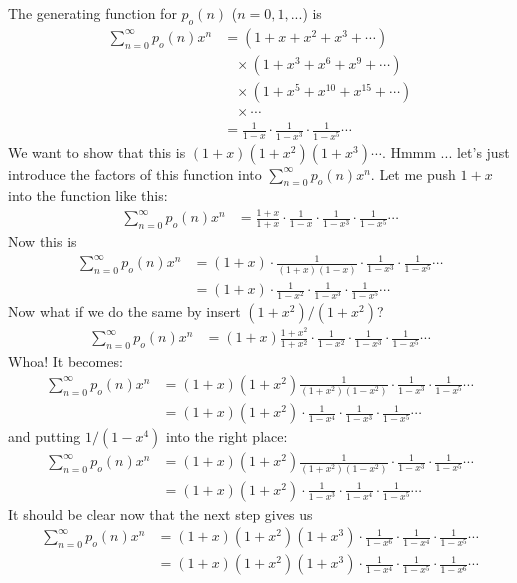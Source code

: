 The generating function for $p_o(n)$ ($n=0,1,...$) is
\begin{align*}
\sum_{n=0}^\infty p_o(n) x^n 
&= (1 + x + x^2 + x^3 + \cdots ) \\
& \,\,\,\,\, \times (1 + x^3 + x^6 + x^9 + \cdots ) \\
& \,\,\,\,\, \times (1 + x^5 + x^{10} + x^{15} + \cdots ) \\
& \,\,\,\,\, \times \cdots \\
&= \frac{1}{1 - x} \cdot \frac{1}{1 - x^3} \cdot\frac{1}{1 - x^5} \cdots 
\end{align*}
We want to show that this is $(1 + x) (1 + x^2) (1 + x^3) \cdots$.
Hmmm ... let's just introduce the factors of this function into $\sum_{n=0}^\infty p_o(n)x^n$.
Let me push $1+x$ into the function like this:
\begin{align*}
\sum_{n=0}^\infty p_o(n) x^n 
&= \frac{1+x}{1+x} \cdot \frac{1}{1 - x} \cdot \frac{1}{1 - x^3} \cdot\frac{1}{1 - x^5} \cdots 
\end{align*}
Now this is
\begin{align*}
\sum_{n=0}^\infty p_o(n) x^n 
&= (1+x) \cdot \frac{1}{(1+x)(1-x)} \cdot \frac{1}{1 - x^3} \cdot\frac{1}{1 - x^5} \cdots \\ 
&= (1+x) \cdot \frac{1}{1 - x^2} \cdot \frac{1}{1 - x^3} \cdot\frac{1}{1 - x^5} \cdots 
\end{align*}
Now what if we do the same by insert $(1+x^2)/(1+x^2)$?
\begin{align*}
\sum_{n=0}^\infty p_o(n) x^n 
&= (1+x) \frac{1+x^2}{1+x^2}\cdot \frac{1}{1 - x^2} \cdot \frac{1}{1 - x^3} \cdot\frac{1}{1 - x^5} \cdots 
\end{align*}
Whoa! It becomes:
\begin{align*}
\sum_{n=0}^\infty p_o(n) x^n 
&= (1+x)(1+x^2) \frac{1}{(1+x^2)(1 - x^2)} \cdot \frac{1}{1 - x^3} \cdot\frac{1}{1 - x^5} \cdots \\
&= (1+x)(1+x^2) \cdot \frac{1}{1 - x^4} \cdot \frac{1}{1 - x^3} \cdot\frac{1}{1 - x^5} \cdots 
\end{align*}
and putting $1/(1-x^4)$ into the right place:
\begin{align*}
\sum_{n=0}^\infty p_o(n) x^n 
&= (1+x)(1+x^2) \frac{1}{(1+x^2)(1 - x^2)} \cdot \frac{1}{1 - x^3} \cdot\frac{1}{1 - x^5} \cdots \\
&= (1+x)(1+x^2) \cdot  \frac{1}{1 - x^3} \cdot \frac{1}{1 - x^4} \cdot \frac{1}{1 - x^5} \cdots 
\end{align*}
It should be clear now that the next step gives us
\begin{align*}
\sum_{n=0}^\infty p_o(n) x^n 
&= (1+x)(1+x^2)(1+x^3) \cdot  \frac{1}{1 - x^6} \cdot \frac{1}{1 - x^4} \cdot \frac{1}{1 - x^5} \cdots  \\
&= (1+x)(1+x^2)(1+x^3) \cdot   \frac{1}{1 - x^4} \cdot \frac{1}{1 - x^5} \cdot \frac{1}{1 - x^6} \cdots 
\end{align*}
